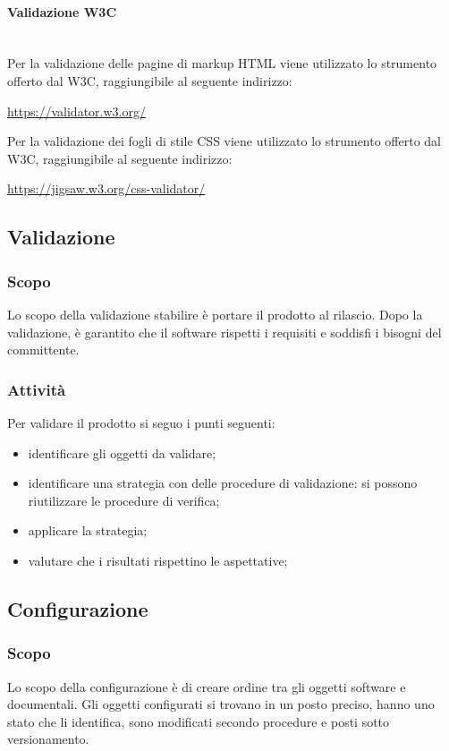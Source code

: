 		\paragraph{Validazione W3C} \mbox{}\\
		Per la validazione delle pagine di markup HTML viene utilizzato lo strumento offerto dal W3C, raggiungibile al seguente indirizzo: \newline
		\centerline{\url{https://validator.w3.org/}} \newline
		Per la validazione dei fogli di stile CSS viene utilizzato lo strumento offerto dal W3C, raggiungibile al seguente indirizzo: \newline
		\centerline{\url{https://jigsaw.w3.org/css-validator/}} \newline

\subsection{Validazione}
	\subsubsection{Scopo}
	Lo scopo della validazione stabilire è portare il prodotto al rilascio. Dopo la validazione, è garantito che il software rispetti i requisiti e soddisfi i bisogni del committente. 
	\subsubsection{Attività}
	Per validare il prodotto si seguo i punti seguenti:
	\begin{itemize}
		\item identificare gli oggetti da validare;
		\item identificare una strategia con delle procedure di validazione: si possono riutilizzare le procedure di verifica;
		\item applicare la strategia;
		\item valutare che i risultati rispettino le aspettative;
	\end{itemize}

\subsection{Configurazione}
	\subsubsection{Scopo}
	Lo scopo della configurazione è di creare ordine tra gli oggetti software e documentali. Gli oggetti configurati si trovano in un posto preciso, hanno uno stato che li identifica, sono modificati secondo procedure e posti sotto versionamento.
